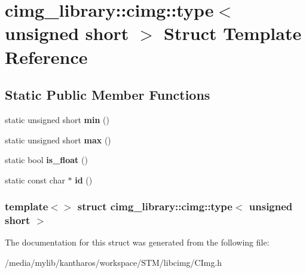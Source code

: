 \hypertarget{structcimg__library_1_1cimg_1_1type_3_01unsigned_01short_01_4}{
\section{cimg\_\-library::cimg::type$<$ unsigned short $>$ Struct Template Reference}
\label{structcimg__library_1_1cimg_1_1type_3_01unsigned_01short_01_4}
}
\subsection*{Static Public Member Functions}
\begin{DoxyCompactItemize}
\item 
\hypertarget{structcimg__library_1_1cimg_1_1type_3_01unsigned_01short_01_4_a52002e19b832218a771066beefeb3bd4}{
static unsigned short {\bfseries min} ()}
\label{structcimg__library_1_1cimg_1_1type_3_01unsigned_01short_01_4_a52002e19b832218a771066beefeb3bd4}

\item 
\hypertarget{structcimg__library_1_1cimg_1_1type_3_01unsigned_01short_01_4_acbecd19f66d0da2803720f3055f4b73c}{
static unsigned short {\bfseries max} ()}
\label{structcimg__library_1_1cimg_1_1type_3_01unsigned_01short_01_4_acbecd19f66d0da2803720f3055f4b73c}

\item 
\hypertarget{structcimg__library_1_1cimg_1_1type_3_01unsigned_01short_01_4_a14d5fda4f730cb86296a71ad610a4ce5}{
static bool {\bfseries is\_\-float} ()}
\label{structcimg__library_1_1cimg_1_1type_3_01unsigned_01short_01_4_a14d5fda4f730cb86296a71ad610a4ce5}

\item 
\hypertarget{structcimg__library_1_1cimg_1_1type_3_01unsigned_01short_01_4_abd4cf944e2f9bb1777a448cee99d2ee0}{
static const char $\ast$ {\bfseries id} ()}
\label{structcimg__library_1_1cimg_1_1type_3_01unsigned_01short_01_4_abd4cf944e2f9bb1777a448cee99d2ee0}

\end{DoxyCompactItemize}
\subsubsection*{template$<$$>$ struct cimg\_\-library::cimg::type$<$ unsigned short $>$}



The documentation for this struct was generated from the following file:\begin{DoxyCompactItemize}
\item 
/media/mylib/kantharos/workspace/STM/libcimg/CImg.h\end{DoxyCompactItemize}
